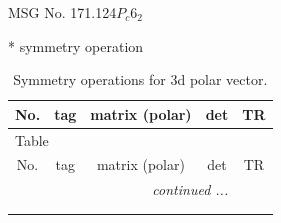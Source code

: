 \documentclass[fleqn,8pt]{jsarticle}
\begin{document}
\setcounter{MaxMatrixCols}{32}

\renewcommand{\tablename}{Table~}
\renewcommand{\figurename}{Figure~}
\begin{center}
\LARGE
MSG No. 171.124\quad$P_{c}6_{2}$
\end{center}
* symmetry operation
\renewcommand{\arraystretch}{1.3}
\begin{longtable}{ccccc}
\caption{Symmetry operations for 3d polar vector.}
 \\
 \hline \hline
No. & tag & matrix (polar) & det & TR \\ \hline \endfirsthead

\multicolumn{4}{l}{\tablename\ \thetable{}} \\
 \hline \hline
No. & tag & matrix (polar) & det & TR \\ \hline \endhead

 \hline \hline
\multicolumn{4}{r}{\footnotesize\it continued ...} \\ \endfoot

 \hline \hline
\multicolumn{4}{r}{} \\ \endlastfoot


\end{longtable}
\end{document}
